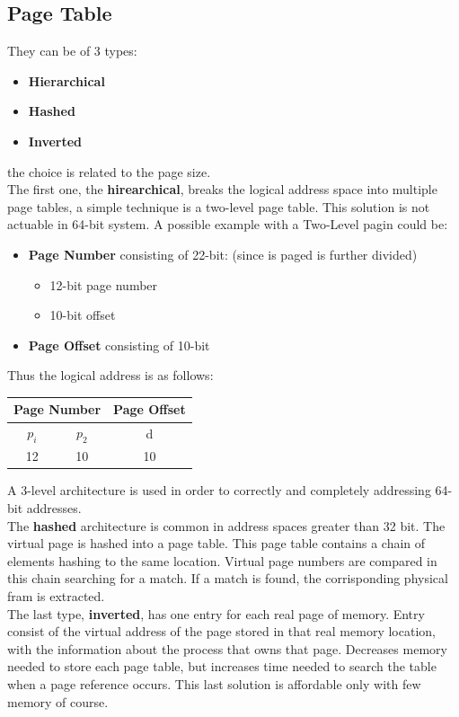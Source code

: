 \documentclass[12pt]{article}
\begin{document}
\subsection{Page Table}
They can be of 3 types:
\begin{itemize}
  \item \textbf{Hierarchical}
  \item \textbf{Hashed}
  \item \textbf{Inverted}
\end{itemize}
the choice is related to the page size.\\
The first one, the \textbf{hirearchical}, breaks the logical address space into multiple page tables, a simple technique is a two-level page table. This solution is not actuable in 64-bit system.
A possible example with a Two-Level pagin could be:
\begin{itemize}
  \item \textbf{Page Number} consisting of 22-bit: (since is paged is further divided)
  \begin{itemize}
    \item 12-bit page number
    \item 10-bit offset
  \end{itemize}
  \item \textbf{Page Offset} consisting of 10-bit
\end{itemize}
Thus the logical address is as follows:
\begin{center}
  \begin{tabular}{ |c|c|c| }
    \hline
    \multicolumn{2}{|c|}{\textbf{Page Number}} & \textbf{Page Offset}\\
    \hline
    $p_i$ & $p_2$ & d\\
    \hline
    12 & 10 & 10\\
    \hline
  \end{tabular}
\end{center}
A 3-level architecture is used in order to correctly and completely addressing 64-bit addresses.\\
The \textbf{hashed} architecture is common in address spaces greater than 32 bit. The virtual page is hashed into a page table. This page table contains a chain of elements hashing to the same location. Virtual page numbers are compared in this chain searching for a match. If a match is found, the corrisponding physical fram is extracted.\\
The last type, \textbf{inverted}, has one entry for each real page of memory. Entry consist of the virtual address of the page stored in that real memory location, with the information about the process that owns that page. Decreases memory needed to store each page table, but increases time needed to search the table when a page reference occurs. This last solution is affordable only with few memory of course.
\end{document}
